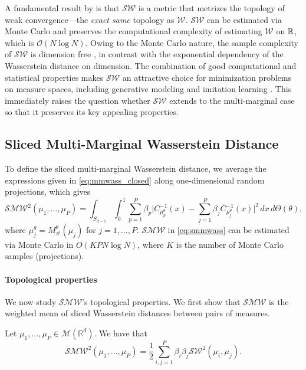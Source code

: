 A fundamental result by \textcite{bonnottee} is that $\mathcal{SW}$ is a metric that metrizes the topology of weak convergence---the \emph{exact same} topology as $\mathcal{W}$.
$\mathcal{SW}$ can be estimated via Monte Carlo and preserves the computational complexity of estimating $\mathcal{W}$ on $\mathbb{R}$, which is $\mathcal{O}(N\log N)$.
Owing to the Monte Carlo nature, the sample complexity of $\mathcal{SW}$ is dimension free \cite{bonnottee, topstatprop}, in contrast with the exponential dependency of the Wasserstein distance on dimension.
The combination of good computational and statistical properties makes $\mathcal{SW}$ an attractive choice for  minimization problems on measure spaces, including generative modeling and imitation learning \cite{maxsliced, Dadashi2020PrimalWI}.
This immediately raises the question whether $\mathcal{SW}$ extends to the multi-marginal case so that it preserves its key appealing properties.


\subsection{Sliced Multi-Marginal Wasserstein Distance}

To define the sliced multi-marginal Wasserstein distance, we average the expressions given in \eqref{eq:mmwass_closed} along  one-dimensional random projections, which gives
\[
\label{eq:smmwass}
\mathcal{SMW}^2(\mu_1,\ldots,\mu_P) = \int_{S_{d-1}} \int_{0}^1 \sum_{p=1}^{P} \beta_p\Big| C_{\mu_p^{\theta}}^{-1}(x)-\sum_{j=1}^P \beta_j   C_{\mu_j^{\theta}}^{-1}(x) \Big|^2 \, dx \, d\Theta(\theta),
\]
where $ \mu_j^{\theta} = M^{\theta}_{\#} (\mu_j)$ for $ j=1,\ldots,P$.
$\mathcal{SMW}$ in \eqref{eq:smmwass} can be estimated via Monte Carlo in $O(KPN\log N)$, where $K$ is the number of Monte Carlo samples (projections). 

\paragraph{Topological properties}
We now study $\mathcal{SMW}$'s  topological properties. We first show that  $\mathcal{SMW}$  is the weighted mean of sliced Wasserstein distances between pairs of measures.

\begin{prop}
	Let $\mu_1,\dots,\mu_P \in \mathcal{M}(\mathbb{R}^d)$. We have that
	\[
	\mathcal{SMW}^2(\mu_1, \ldots, \mu_P)  = \frac{1}{2} \sum_{i,j=1}^P \beta_i \beta_j \mathcal{SW}^2(\mu_i,\mu_j)
	.
	\label{eq:meansliced}
	\] 
	\label{prop:meansliced}
\end{prop}

